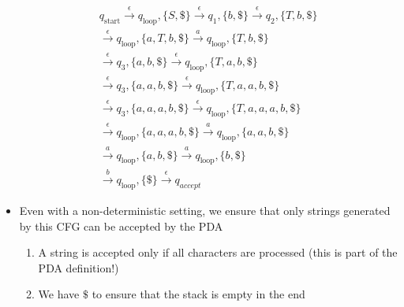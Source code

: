 \begin{frame}[allowframebreaks]
\begin{eqnarray*}
&& q_{\text{start}} \stackrel{\epsilon}{\rightarrow}
q_{\text{loop}}, \{S,\$\} 
\stackrel{\epsilon}{\rightarrow} q_1, \{b,\$\}
\stackrel{\epsilon}{\rightarrow} q_2, \{T,b,\$\} \\
&& \stackrel{\epsilon}{\rightarrow} q_{\text{loop}}, \{a,T,b,\$\} 
\stackrel{a}{\rightarrow}
 q_{\text{loop}}, \{T,b,\$\} \\
&& \stackrel{\epsilon}{\rightarrow} q_{3}, \{a, b,\$\} 
\stackrel{\epsilon}{\rightarrow} q_{\text{loop}}, \{T,a,b,\$\}\\
&& \stackrel{\epsilon}{\rightarrow} q_3, \{a,a,b,\$\}
\stackrel{\epsilon}{\rightarrow} q_{\text{loop}}, \{T,a,a,b,\$\}\\
&& \stackrel{\epsilon}{\rightarrow} q_3, \{a,a,a,b,\$\}
\stackrel{\epsilon}{\rightarrow} q_{\text{loop}}, \{T,a,a,a,b,\$\}\\
&& \stackrel{\epsilon}{\rightarrow} q_{\text{loop}}, \{a,a,a,b,\$\}
\stackrel{a}{\rightarrow} q_{\text{loop}}, \{a,a,b,\$\}\\
&& \stackrel{a}{\rightarrow} q_{\text{loop}},\{a,b,\$\}
\stackrel{a}{\rightarrow} q_{\text{loop}}, \{b,\$\}\\
&& \stackrel{b}{\rightarrow} q_{\text{loop}}, \{\$\}
\stackrel{\epsilon}{\rightarrow} q_{accept}
\end{eqnarray*}
\begin{itemize}
\item 
  Even with a non-deterministic setting, we ensure that only strings generated
  by this CFG can be accepted by the PDA
  \begin{enumerate}
  \item A string is accepted only if all characters are processed
    (this is part of the PDA definition!)
  \item We have $\$$ to ensure that the stack is empty in the end
  \end{enumerate}
\end{itemize}
\end{frame}



